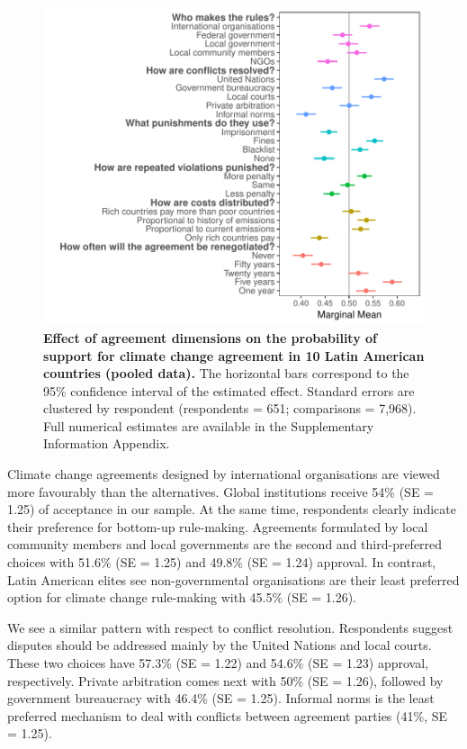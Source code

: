 \documentclass[a4paper,12pt]{article}
\begin{document}
\begin{figure}[H]
	\centering
	\includegraphics[width=.9\linewidth]{pooled.pdf}
	\caption{\textbf{Effect of agreement dimensions on the probability of support for climate change agreement in 10 Latin American countries (pooled data).} The horizontal bars correspond to the 95\% confidence interval of the estimated effect. Standard errors are clustered by respondent (respondents = 651; comparisons = 7,968). Full numerical estimates are available in the Supplementary Information Appendix.}
	\label{fig:pooled}
\end{figure}

Climate change agreements designed by international organisations are viewed more favourably than the alternatives. Global institutions receive 54\% (SE = 1.25) of acceptance in our sample. At the same time, respondents clearly indicate their preference for bottom-up rule-making. Agreements formulated by local community members and local governments are the second and third-preferred choices with 51.6\% (SE = 1.25) and 49.8\% (SE = 1.24) approval. In contrast, Latin American elites see non-governmental organisations are their least preferred option for climate change rule-making with 45.5\% (SE = 1.26). 

We see a similar pattern with respect to conflict resolution. Respondents suggest disputes should be addressed mainly by the United Nations and local courts. These two choices have 57.3\% (SE = 1.22) and 54.6\% (SE = 1.23) approval, respectively. Private arbitration comes next with 50\% (SE = 1.26), followed by government bureaucracy with 46.4\% (SE = 1.25). Informal norms is the least preferred mechanism to deal with conflicts between agreement parties (41\%, SE = 1.25). 
\end{document}
